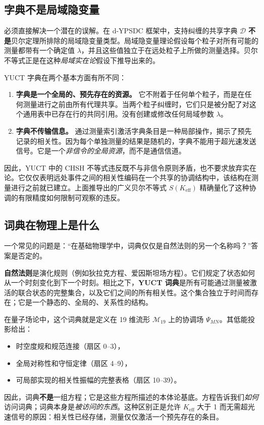 \documentclass[12pt,a4paper]{article}
\theoremstyle{remark}
\begin{document}
	\subsection*{字典不是局域隐变量}
	
	必须直接解决一个潜在的误解。在 d-YPSDC 框架中，支持纠缠的共享字典 $\mathcal{D}$ \textbf{不是}贝尔定理所排除的局域隐变量类型。局域隐变量理论假设每个粒子对所有可能的测量都带有一个确定值 $\lambda$，并且这些值独立于在远处粒子上所做的测量选择。贝尔不等式正是在这种\emph{局域实在论}假设下推导出来的。
	
	YUCT 字典在两个基本方面有所不同：
	
	\begin{enumerate}[leftmargin=*]
		\item \textbf{字典是一个全局的、预先存在的资源。}
		它不附着于任何单个粒子，而是在任何测量进行之前由所有代理共享。当两个粒子纠缠时，它们只是被分配了对这个通用表中已存在行的共同引用。没有创建或修改任何局域参数 $\lambda$。
		
		\item \textbf{字典不传输信息。}
		通过测量索引激活字典条目是一种局部操作，揭示了预先记录的相关性。因为每个单独测量的结果是随机的，字典不能用于超光速发送信号。它是一个\emph{非信令的全局资源}，而不是通信信道。
	\end{enumerate}
	
	因此，YUCT 中的 CHSH 不等式违反既不与非信令原则矛盾，也不要求放弃实在论。它仅仅表明远处事件之间的相关性编码在一个共享的协调结构中，该结构在测量进行之前就已建立。上面推导出的广义贝尔不等式 $S(K_{\mathrm{eff}})$ 精确量化了这种协调的有限精度如何限制可观察的违反。
	
\subsection*{词典在物理上是什么}

一个常见的问题是：“在基础物理学中，词典仅仅是自然法则的另一个名称吗？”答案是否定的。

\textbf{自然法则}是演化规则（例如狄拉克方程、爱因斯坦场方程）。它们规定了状态如何从一个时刻变化到下一个时刻。相比之下，\textbf{YUCT 词典}是所有可能通过测量被激活的联合状态的完整集合，以及它们之间的所有相关性。这个集合独立于时间而存在；它是一个静态的、全局的、关系性的结构。

在量子场论中，这个词典就是定义在 19 维流形 \(\mathcal{M}_{19}\) 上的协调场 \(\Psi_{MN}\)。其低能投影给出：
\begin{itemize}
	\item 时空度规和规范连接（扇区 0--3），
	\item 全局对称性和守恒定律（扇区 4--9），
	\item 可局部实现的相关性振幅的完整表格（扇区 10--39）。
\end{itemize}
因此，词典\textbf{不是}一组方程；它是这些方程所描述的本体论基底。方程告诉我们\emph{如何}访问词典；词典本身是\emph{被访问的东西}。这种区别正是允许 \(K_{\mathrm{eff}}\) 大于 1 而无需超光速信号的原因：相关性已经存储，测量仅仅激活一个预先存在的条目。
\end{document}
